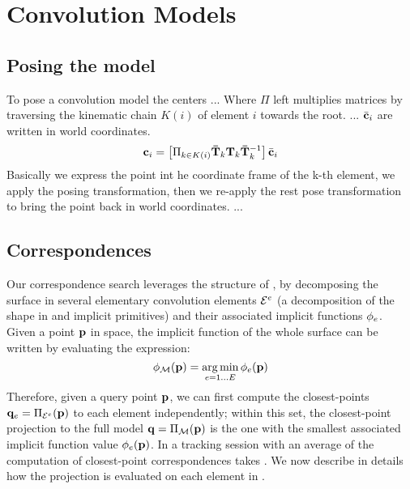 
\section{Convolution Models}
\label{sec:model}



\subsection{Posing the model}
\label{sec:posing}
% 
\begin{DRAFT}
To pose a convolution model the centers ... 
Where $\Pi$ left multiplies matrices by traversing the kinematic chain $K(i)$ of element $i$ towards the root.
... $\bar{\mathbf{c}}_i$ are written in world coordinates.
% 
\begin{equation}
\mathbf{c}_i = \left[ \Pi_{k \in K(i)} \mathbf{\bar{T}}_k \mathbf{T}_k \mathbf{\bar{T}}_k^{-1} \right] \bar{\mathbf{c}}_i
\label{eq:kinematic}
\end{equation}
% 
Basically we express the point int he coordinate frame of the k-th element, we apply the posing transformation, then we re-apply the rest pose transformation to bring the point back in world coordinates. ... 
\end{DRAFT}

\subsection{Correspondences}
\label{sec:corresp}
Our correspondence search leverages the structure of , by decomposing the surface in several elementary convolution elements $\mathcal{E}^e$ (a decomposition of the shape in  and  implicit primitives) and their associated implicit functions $\phi_e$. Given a point $\mathbf{p}$ in space, the implicit function of the whole surface can be written by evaluating the expression:
\begin{equation}
\phi_{\mathcal{M}}(\mathbf{p}) = \operatorname*{arg\,min}_{e=1 \dots E} \phi_e(\mathbf{p})
\label{eq:piecewise}
\end{equation}
Therefore, given a query point $\mathbf{p}$, we can first compute the closest-points $\mathbf{q}_e = \Pi_{\mathcal{E}^e}(\mathbf{p})$ to each element independently; within this set, the closest-point projection to the full model $\mathbf{q} = \Pi_{\mathcal{M}}(\mathbf{p})$ is the one with the smallest associated implicit function value $\phi_e(\mathbf{p})$. In a tracking session with an average of  the computation of closest-point correspondences takes . We now describe in details how the projection is evaluated on each element in . 

